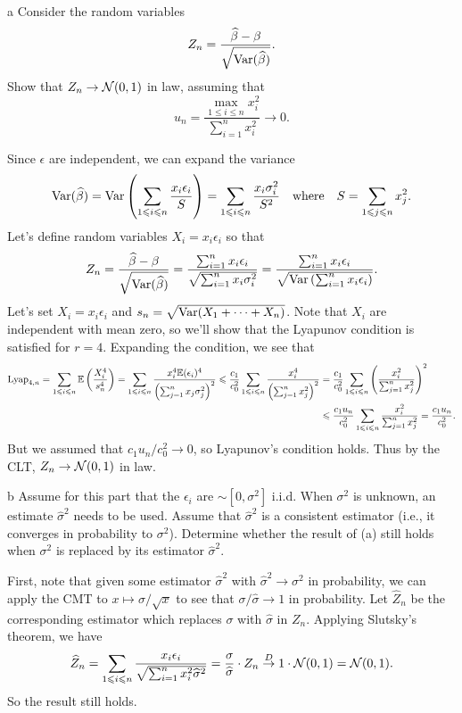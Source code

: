 \documentclass{pset}
\begin{document}
\begin{parts}
  \begin{part}{a}
  Consider the random variables \[ Z_n = \frac{\widehat{\beta} - \beta}{\sqrt{\textrm{Var}(\widehat{\beta})}}.\]
  Show that $Z_n \to \mathcal{N}(0,1)$ in law, assuming that
  \[
    u_n = \frac{\max_{1\leq i \leq n} x_i^2}{\sum^n_{i=1} x_i^2} \to 0.
  \]
  \end{part}

  Since $\epsilon$ are independent, we can expand the variance
  \[
    \textrm{Var}(\widehat{\beta}) = \textrm{Var}\left(\sum_{1\leqslant i\leqslant n} \frac{x_i\epsilon_i}{S}\right) = \sum_{1\leqslant i\leqslant n} \frac{x_i\sigma_i^2}{S^2} \quad\textrm{where}\quad S = \sum_{1\leqslant j\leqslant n}x_j^2.
  \]
  Let's define random variables $X_i = x_i\epsilon_i$ so that
  \[
    Z_n = \frac{\widehat{\beta}-\beta}{\sqrt{\textrm{Var}(\widehat{\beta})}}=\frac{\sum_{i=1}^n x_i\epsilon_i}{\sqrt{\sum_{i=1}^n x_i \sigma_i^2}} = \frac{\sum^n_{i=1} x_i\epsilon_i}{\sqrt{\textrm{Var}\left(\sum_{i=1}^n x_i\epsilon_i\right)}}.
  \]
  Let's set $X_i = x_i\epsilon_i$ and $s_n= \sqrt{\textrm{Var}(X_1+\cdots+X_n)}$. Note that $X_i$ are independent with mean zero, so we'll show that the Lyapunov condition is satisfied for $r=4$. Expanding the condition, we see that
  \[
    \begin{aligned}
      \textrm{Lyap}_{4,n}=\sum_{1\leqslant i \leqslant n}\mathbb{E}\left(\frac{X_i^4}{s_n^4}\right) = \sum_{1\leqslant i \leqslant n}\frac{x_i^4\mathbb{E}(\epsilon_i)^4}{\left(\sum^n_{j=1} x_j\sigma_j^2\right)^2} 
      \leqslant  \frac{c_1}{c_0^2}\sum_{1\leqslant i\leqslant n}\frac{x_i^4}{\left(\sum^n_{j=1} x_j^2\right)^2}
      &=\frac{c_1}{c_0^2}\sum_{1\leqslant i \leqslant n}\left(\frac{x_i^2}{\sum^n_{j=1} x_j^2}\right)^2\\
      &\leqslant \frac{c_1u_n}{c_0^2}\sum_{1\leqslant i \leqslant n}\frac{x_i^2}{\sum^n_{j=1} x_j^2} = \frac{c_1u_n}{c_0^2}.
    \end{aligned}
  \]
  But we assumed that $c_1u_n/c_0^2\to 0$, so Lyapunov's condition holds. Thus by the CLT, $Z_n \to \mathcal{N}(0,1)$ in law.

  \begin{part}{b}
    Assume for this part that the $\epsilon_i$ are $\sim [0, \sigma^2]$ i.i.d. When $\sigma^2$ is unknown, an estimate $\widehat{\sigma}^2$ needs to be used. Assume that $\widehat{\sigma}^2$ is a consistent estimator (i.e., it converges in probability to $\sigma^2$). Determine whether the result of (a) still holds when $\sigma^2$ is replaced by its estimator $\widehat{\sigma}^2$.
  \end{part}

  First, note that given some estimator $\widehat{\sigma}^2$ with $\widehat{\sigma}^2\to \sigma^2$ in probability, we can apply the CMT to $x\mapsto \sigma/\sqrt{x}$ to see that $\sigma/\widehat{\sigma} \to 1$ in probability. Let $\widehat{Z}_n$ be the corresponding estimator which replaces $\sigma$  with $\widehat{\sigma}$ in $Z_n$. Applying Slutsky's theorem, we have
  \[
    \widehat{Z}_n = \sum_{1\leq i \leq n}\frac{x_i\epsilon_i}{\sqrt{\sum^n_{i=1} x_i^2 \widehat{\sigma}^2}} = \frac{\sigma}{\widehat{\sigma}}\cdot Z_n \toD 1\cdot \N(0,1) = \N(0,1).
  \]
  So the result still holds.
\end{parts}
\end{document}
